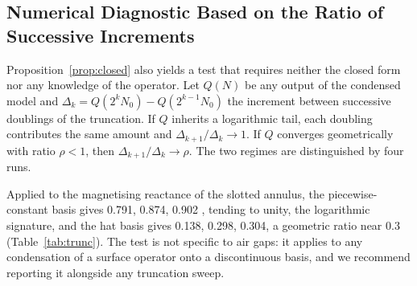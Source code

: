 \documentclass[10pt,a4paper,twocolumn]{article}
\theoremstyle{plain}
\theoremstyle{remark}
\begin{document}
\subsection{Numerical Diagnostic Based on the Ratio of Successive Increments}
\label{sub:ratios}

Proposition~\ref{prop:closed} also yields a test that requires neither
the closed form nor any knowledge of the operator. Let $Q(N)$ be any
output of the condensed model and
$\Delta_k=Q(2^{k}N_0)-Q(2^{k-1}N_0)$ the increment between successive
doublings of the truncation. If $Q$ inherits a logarithmic tail, each
doubling contributes the same amount and
$\Delta_{k+1}/\Delta_k\to1$. If $Q$ converges geometrically with ratio
$\rho<1$, then $\Delta_{k+1}/\Delta_k\to\rho$. The two regimes are
distinguished by four runs.

Applied to the magnetising reactance of the slotted annulus, the
piecewise-constant basis gives \num{0.791}, \num{0.874}, \num{0.902}
, tending to unity, the logarithmic signature, and the hat basis gives
\num{0.138}, \num{0.298}, \num{0.304}, a geometric ratio near
\num{0.3} (Table~\ref{tab:trunc}). The test is not
specific to air gaps: it applies to any condensation of a surface
operator onto a discontinuous basis, and we recommend reporting it
alongside any truncation sweep.
\end{document}
